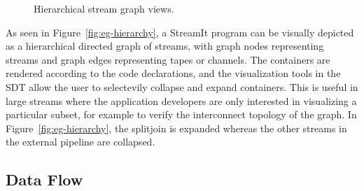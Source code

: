 \documentclass[11pt, letterpaper, onecolumn]{article}
\begin{document}
\begin{figure}[t]
\begin{center}
{    
  }
  \caption{Hierarchical stream graph views.}
  \label{fig:hierarchy}
\end{center}
\end{figure}

As seen  in Figure~\ref{fig:eg-hierarchy},  a StreamIt program  can be
visually depicted  as a hierarchical  directed graph of  streams, with
graph nodes representing streams and graph edges representing tapes or
channels.   The   containers  are  rendered  according   to  the  code
declarations, and the visualization tools in the SDT allow the user to
selectevily collapse  and expand containers. This is  useful in large
streams  where  the  application  developers  are only  interested  in
visualizing   a  particular   subset,  for   example  to   verify  the
interconnect topology of  the graph. In Figure~\ref{fig:eg-hierarchy},
the splitjoin  is expanded whereas  the other streams in  the external
pipeline are collapsed.


\subsection{Data Flow}

\end{document}
